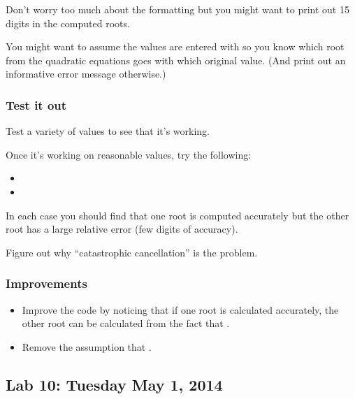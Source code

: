 \documentclass[letterpaper,10pt,english]{sphinxmanual}
\begin{document}
Don't worry too much about the formatting but you might want to print out 15
digits in the computed roots.

You might want to assume the values are entered with  so
you know which root from the quadratic equations goes with which original
value. (And print out an informative error message otherwise.)


\subsubsection{Test it out}
\label{labs/lab9:test-it-out}
Test a variety of values to see that it's working.

Once it's working on reasonable values, try the following:
\begin{itemize}
\item {} 

\item {} 

\end{itemize}

In each case you should find that one root is computed accurately
but the other root has a large relative error (few digits of accuracy).

Figure out why ``catastrophic cancellation'' is the problem.


\subsubsection{Improvements}
\label{labs/lab9:improvements}\begin{itemize}
\item {} 
Improve the code by noticing that if one root is calculated accurately, the
other root can be calculated from the fact that .

\item {} 
Remove the assumption that .

\end{itemize}


\subsection{Lab 10: Tuesday May 1, 2014}
\label{labs/lab10:lab-10-tuesday-may-1-2014}\label{labs/lab10::doc}\label{labs/lab10:lab10}
\end{document}
